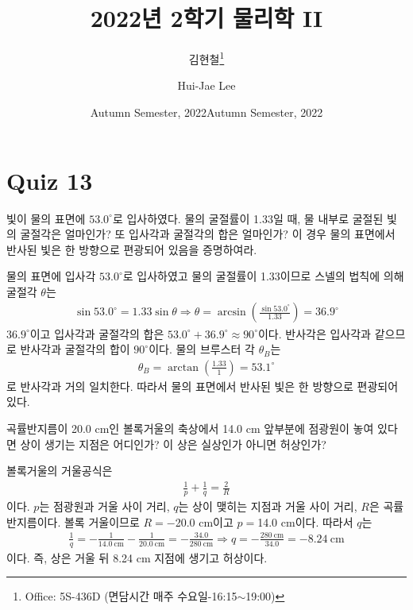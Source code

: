 \documentclass[tightenlines,floatfix,nofootinbib,superscriptaddress,fleqn]{revtex4-2}
\begin{document}
\title{\Large 2022년 2학기 물리학 II}
\author{김현철\footnote{Office: 5S-436D (면담시간 매주
    수요일-16:15$\sim$19:00)}} 
\date{Autumn Semester, 2022}
\author{Hui-Jae Lee} 
\date{Autumn Semester, 2022}
\maketitle


\section*{\large Quiz 13}
빛이 물의 표면에 $53.0^\circ$로 입사하였다. 물의 굴절률이 1.33일 때, 물
내부로 굴절된 빛의 굴절각은 얼마인가? 또 입사각과 굴절각의 합은
얼마인가? 이 경우 물의 표면에서 반사된 빛은 한 방향으로 편광되어
있음을 증명하여라. 

물의 표면에 입사각 $53.0^\circ$로 입사하였고 물의 굴절률이 1.33이므로 스넬의 법칙에 의해
굴절각 $\theta$는
\begin{align}
  \sin 53.0^\circ = 1.33\sin\theta \Longrightarrow
  \theta = \arcsin\left(\frac{\sin 53.0^\circ}{1.33}\right)=36.9^\circ
\end{align}
$36.9^\circ$이고 입사각과 굴절각의 합은 $53.0^\circ+36.9^\circ\approx 90^\circ$이다.
반사각은 입사각과 같으므로 반사각과 굴절각의 합이 $90^\circ$이다. 물의 브루스터 각 $\theta_B$는
\begin{align}
  \theta_B = \arctan\left(\frac{1.33}{1}\right)
  =53.1^\circ
\end{align}
로 반사각과 거의 일치한다. 따라서 물의 표면에서 반사된 빛은 한 방향으로 편광되어 있다.
\vspace{1cm}

곡률반지름이 20.0 cm인 볼록거울의 축상에서 14.0 cm 앞부분에 점광원이
놓여 있다면 상이 생기는 지점은 어디인가? 이 상은 실상인가 아니면 허상인가?

볼록거울의 거울공식은
\begin{align}
  \frac{1}{p} + \frac{1}{q} = \frac{2}{R}
\end{align}
이다. $p$는 점광원과 거울 사이 거리, $q$는 상이 맺히는 지점과 거울 사이 거리, 
$R$은 곡률 반지름이다. 볼록 거울이므로 $R =-$20.0 cm이고 $p=$14.0 cm이다. 따라서 $q$는
\begin{align}
  \frac{1}{q} = -\frac{1}{14.0~\mathrm{cm}} -\frac{1}{20.0~\mathrm{cm}}
  = -\frac{34.0}{280~\mathrm{cm}} \Longrightarrow
  q = -\frac{280~\mathrm{cm}}{34.0} = -8.24~\mathrm{cm}
\end{align}
이다. 즉, 상은 거울 뒤 8.24 cm 지점에 생기고 허상이다.
\vspace{1cm}
\end{document}
